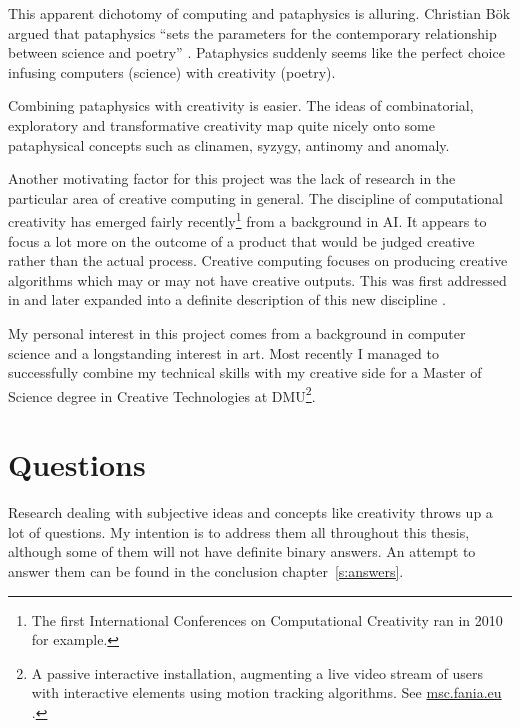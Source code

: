 This apparent dichotomy of computing and pataphysics is alluring. Christian B{\"o}k argued that pataphysics ``sets the parameters for the contemporary relationship between science and poetry'' \autocite*{Bok2002}. Pataphysics suddenly seems like the perfect choice infusing computers (science) with creativity (poetry).

Combining pataphysics with creativity is easier. The ideas of combinatorial, exploratory and transformative creativity map quite nicely onto some pataphysical concepts such as clinamen, syzygy, antinomy and anomaly. 

Another motivating factor for this project was the lack of research in the particular area of creative computing in general. The discipline of computational creativity has emerged fairly recently\footnote{The first International Conferences on Computational Creativity ran in 2010 for example.} from a background in \ac{AI}. It appears to focus a lot more on the outcome of a product that would be judged creative rather than the actual process. Creative computing focuses on producing creative algorithms which may or may not have creative outputs. This was first addressed in \autocite{Raczinski2013} and later expanded into a definite description of this new discipline \autocite{Hugill2013c}.

\spirals

My personal interest in this project comes from a background in computer science and a longstanding interest in art. Most recently I managed to successfully combine my technical skills with my creative side for a Master of Science degree in Creative Technologies at \ac{DMU}\footnote{A passive interactive installation, augmenting a live video stream of users with interactive elements using motion tracking algorithms. See \url{msc.fania.eu} \autocite{Raczinski2010}.}. 


\section{Questions}

Research dealing with subjective ideas and concepts like creativity throws up a lot of questions. My intention is to address them all throughout this thesis, although some of them will not have definite binary answers. An attempt to answer them can be found in the conclusion chapter~\ref{s:answers}.

